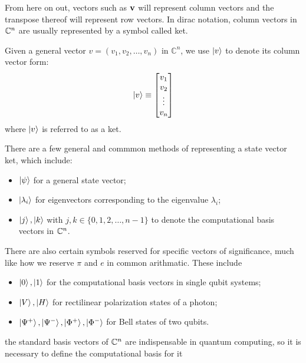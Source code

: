 \documentclass[12pt]{article}
\begin{document}
From here on out, vectors such as $\mathbf{v}$ will represent column vectors and the transpose thereof will represent row vectors. In dirac notation, column vectors in $\mathbb{C}^n$ are usually represented by a symbol called ket. 

\begin{definition}[Ket]
    Given a general vector $v = (v_1, v_2, \ldots, v_n)$ in $\mathbb{C}^n$, we use $\ket{v}$ to denote its column vector form:
    \[
    \ket{v} \equiv \begin{bmatrix}
    v_1 \\
    v_2 \\
    \vdots \\
    v_n
    \end{bmatrix}
    \]
    where $\ket{v}$ is referred to as a ket.
\end{definition}

There are a few general and commmon methods of representing a state vector ket, which include:

\begin{itemize}
    \item $\ket{\psi}$ for a general state vector;
    \item $\ket{\lambda_i}$ for eigenvectors corresponding to the eigenvalue $\lambda_i$;
    \item $\ket{j}, \ket{k}$ with $j, k \in \{0, 1, 2, \ldots, n - 1 \}$ to denote the computational basis vectors in $\mathbb{C}^n$.
\end{itemize}

There are also certain symbols reserved for specific vectors of significance, much like how we reserve $\pi$ and $e$ in common arithmatic. These include

\begin{itemize}
    \item $\ket{0}, \ket{1}$ for the computational basis vectors in single qubit systems;
    \item $\ket{V}, \ket{H}$ for rectilinear polarization states of a photon;
    \item $\ket{\Psi^+}, \ket{\Psi^-}, \ket{\Phi^+}, \ket{\Phi^-}$ for Bell states of two qubits. 
\end{itemize}

the standard basis vectors of $\mathbb{C}^n$ are indispensable in quantum computing, so it is necessary to define the computational basis for it
\end{document}
